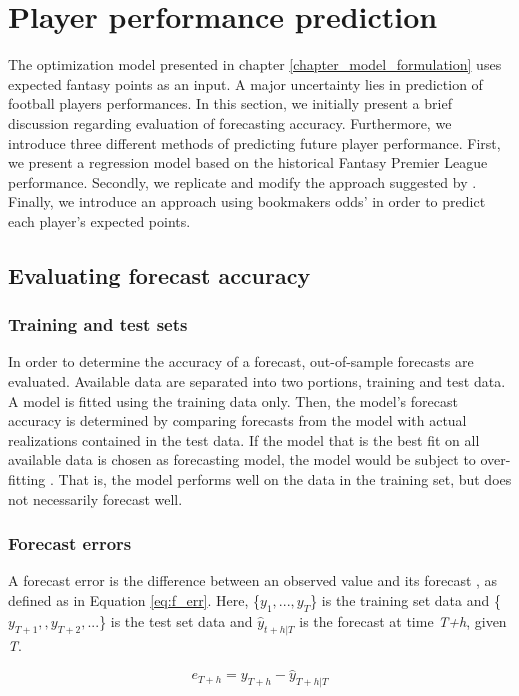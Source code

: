 \section{Player performance prediction}\label{Player_performance_prediction}
The optimization model presented in chapter \ref{chapter_model_formulation} uses expected fantasy points as an input. A major uncertainty lies in prediction of football players performances. In this section, we initially present a brief discussion regarding evaluation of forecasting accuracy. Furthermore, we introduce three different methods of predicting future player performance. First, we present a regression model based on the historical Fantasy Premier League performance. Secondly, we replicate and modify the approach suggested by \cite{Bonomo}. Finally, we introduce an approach using bookmakers odds' in order to predict each player's expected points. 

\subsection{Evaluating forecast accuracy}
\subsubsection{Training and test sets}
In order to determine the accuracy of a forecast, out-of-sample forecasts are evaluated. Available data are separated into two portions, training and test data. A model is fitted using the training data only. Then, the model's forecast accuracy is determined by comparing forecasts from the model with actual realizations contained in the test data. If the model that is the best fit on all available data is chosen as forecasting model, the model would be subject to over-fitting \citep{Hyndman}. That is, the model performs well on the data in the training set, but does not necessarily forecast well.

\subsubsection{Forecast errors}
A forecast error is the difference between an observed value and its forecast \citep{Hyndman}, as defined as in Equation \ref{eq:f_err}. Here, \{$ y_{1},...,y_{T} $\} is the training set data and \{$ y_{T+1},,y_{T+2},...$\} is the test set data and $\hat{y}_{t+h|T}$ is the forecast at time \textit{T+h}, given \textit{T}. 

\begin{equation}\label{eq:f_err}
    e_{T+h} = y_{T+h} - \hat{y}_{T+h|T}
\end{equation}

